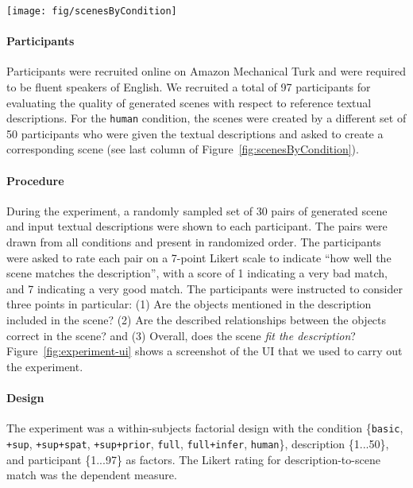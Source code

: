 \documentclass{sigchi}
\newcommand{\cbasic}{\texttt{basic}\xspace}
\newcommand{\csup}{\texttt{+sup}\xspace}
\newcommand{\csupspat}{\texttt{+sup+spat}\xspace}
\newcommand{\csupprior}{\texttt{+sup+prior}\xspace}
\newcommand{\cfull}{\texttt{full}\xspace}
\newcommand{\cinfer}{\texttt{full+infer}\xspace}
\newcommand{\cmanual}{\texttt{human}\xspace}
\newcommand{\SceneSeer}{\textsc{SceneSeer}\xspace}
\begin{document}
\begin{figure*}
  \texttt{[image: fig/scenesByCondition]}
  \caption{Some example textual descriptions and scenes generated by \SceneSeer in different conditions, as well as scenes manually designed by people.}
  \label{fig:scenesByCondition}
\end{figure*}

\paragraph{Participants}
Participants were recruited online on Amazon Mechanical Turk and were required to be fluent speakers of English.  We recruited a total of 97 participants for evaluating the quality of generated scenes with respect to reference textual descriptions.  For the \cmanual condition, the scenes were created by a different set of 50 participants who were given the textual descriptions and asked to create a corresponding scene (see last column of Figure~\ref{fig:scenesByCondition}).

\paragraph{Procedure}

During the experiment, a randomly sampled set of 30 pairs of generated scene and input textual descriptions were shown to each participant.  The pairs were drawn from all conditions and present in randomized order.  The participants were asked to rate each pair on a 7-point Likert scale to indicate ``how well the scene matches the description'', with a score of 1 indicating a very bad match, and 7 indicating a very good match.  The participants were instructed to consider three points in particular: (1) Are the objects mentioned in the description included in the scene? (2) Are the described relationships between the objects correct in the scene? and (3) Overall, does the scene \emph{fit the description}?  Figure~\ref{fig:experiment-ui} shows a screenshot of the UI that we used to carry out the experiment.

\paragraph{Design}

The experiment was a within-subjects factorial design with the condition \{\cbasic, \csup, \csupspat, \csupprior, \cfull, \cinfer, \cmanual{}\}, description \{1...50\}, and participant \{1...97\} as factors.  The Likert rating for description-to-scene match was the dependent measure.
\end{document}
